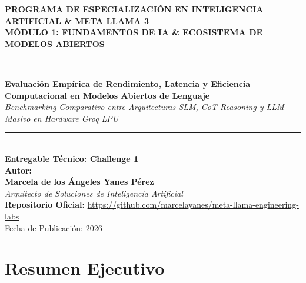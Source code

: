 \documentclass[12pt,letterpaper]{article}
\begin{document}
\begin{titlepage}
  \centering
  \vspace*{1.5cm}
  
  {\Large\textbf{PROGRAMA DE ESPECIALIZACIÓN EN INTELIGENCIA ARTIFICIAL \& META LLAMA 3}}\\[0.8cm]
  {\large\textbf{MÓDULO 1: FUNDAMENTOS DE IA \& ECOSISTEMA DE MODELOS ABIERTOS}}\\[1.5cm]
  
  \rule{\linewidth}{0.6mm}\\[0.5cm]
  {\LARGE\textbf{Evaluación Empírica de Rendimiento, Latencia y Eficiencia Computacional en Modelos Abiertos de Lenguaje}}\\[0.3cm]
  {\large\textit{Benchmarking Comparativo entre Arquitecturas SLM, CoT Reasoning y LLM Masivo en Hardware Groq LPU}}\\[0.2cm]
  \rule{\linewidth}{0.6mm}\\[2cm]
  
  \textbf{Entregable Técnico: Challenge 1}\\[0.8cm]
  
  \textbf{Autor:}\\
  {\Large\textbf{Marcela de los Ángeles Yanes Pérez}}\\
  \textit{Arquitecto de Soluciones de Inteligencia Artificial}\\[2.5cm]
  
  \vfill
  {\large\textbf{Repositorio Oficial:}} \url{https://github.com/marcelayanes/meta-llama-engineering-labs}\\[0.3cm]
  {\small Fecha de Publicación: 2026}
\end{titlepage}

\newpage
{}

\section*{Resumen Ejecutivo}
\end{document}

